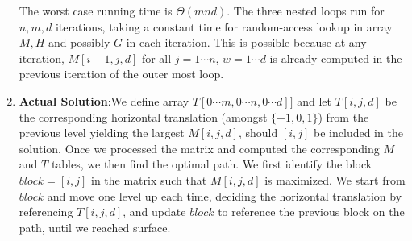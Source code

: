 \documentclass[11pt]{article}
\begin{document}
\begin{solution}
\begin{enumerate}
  \begin{algorithm}[H]

   \end{algorithm}
   The worst case running time is $\Theta(mnd)$. The three nested loops run for $n, m, d$ iterations, taking a constant time for random-access lookup in array $M, H$ and possibly $G$ in each iteration. This is possible because at any iteration, $M[i-1, j, d]$ for all $j=1\cdots n$, $w=1\cdots d$ is already computed in the previous iteration of the outer most loop.
   \item \textbf{Actual Solution}:We define array $T[0\cdots m, 0\cdots n, 0\cdots d]]$ and let $T[i, j, d]$ be the corresponding horizontal translation (amongst $\{ -1, 0, 1 \}$) from the previous level yielding the largest $M[i, j, d]$, should $[i, j]$ be included in the solution. Once we processed the matrix and computed the corresponding $M$ and $T$ tables, we then find the optimal path. We first identify the block $block = [i, j]$ in the matrix such that $M[i, j, d]$ is maximized. We start from $block$ and move one level up each time, deciding the horizontal translation by referencing $T[i, j, d]$, and update $block$ to reference the previous block on the path, until we reached surface.


   \begin{algorithm}[H]



\end{algorithm}
\end{enumerate}
\end{solution}
\end{document}
